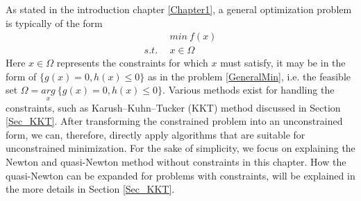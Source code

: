 \documentclass  [
  paper    = a4,
  BCOR     = 10mm,
  twoside,
  fontsize = 12pt,
  fleqn,
  toc      = bibnumbered,
  toc      = listofnumbered,
  numbers  = noendperiod,
  headings = normal,
  listof   = leveldown,
  version  = 3.03
]                                       {scrreprt}
\newcommand{\<}{\langle}
\renewcommand{\>}{\rangle}
\begin{document}
   As stated in the introduction chapter \ref{Chapter1}, a general optimization problem is typically of the form 
   \begin{equation}
   \begin{aligned}
   \  \  \ & min \  f(x) \\
   s.t.\ \  & x \in \Omega
   \end{aligned}
   \label{OptGen}
   \end{equation}
   Here $x \in \Omega$ represents the constraints for which $x$ must satisfy, it may be in the form of $\{g(x) = 0,  h(x)  \leq  0 \}$ as in the problem \ref{GeneralMin}, i.e. the feasible set $\Omega = \underset{x}{arg} \ \{ g(x) = 0,  h(x)  \leq  0 \}$. Various methods exist for handling the constraints, such as  Karush–Kuhn–Tucker (KKT) method discussed in Section \ref{Sec_KKT}. After transforming the constrained problem into an unconstrained form, we can, therefore, directly apply algorithms that are suitable for unconstrained minimization. For the sake of simplicity, we focus on explaining the Newton and quasi-Newton method without constraints in this chapter. How the quasi-Newton can be expanded for problems with constraints, will be explained in the more details in Section \ref{Sec_KKT}. 
   
\end{document}
